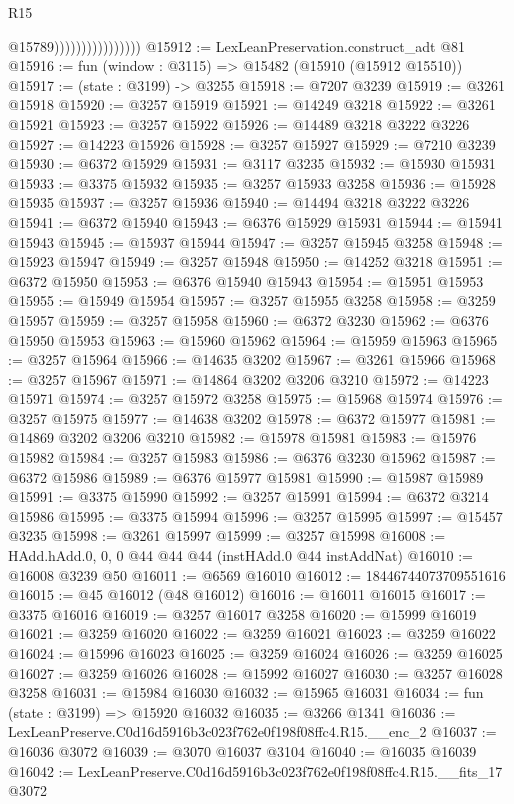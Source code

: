 \begin{lexlean}{R15}
\begin{coremodule}
                                    @15789))))))))))))))))
@15912 := LexLeanPreservation.construct_adt @81
@15916 := fun (window : @3115) => @15482 (@15910 (@15912 @15510))
@15917 := (state : @3199) -> @3255
@15918 := @7207 @3239
@15919 := @3261 @15918
@15920 := @3257 @15919
@15921 := @14249 @3218
@15922 := @3261 @15921
@15923 := @3257 @15922
@15926 := @14489 @3218 @3222 @3226
@15927 := @14223 @15926
@15928 := @3257 @15927
@15929 := @7210 @3239
@15930 := @6372 @15929
@15931 := @3117 @3235
@15932 := @15930 @15931
@15933 := @3375 @15932
@15935 := @3257 @15933 @3258
@15936 := @15928 @15935
@15937 := @3257 @15936
@15940 := @14494 @3218 @3222 @3226
@15941 := @6372 @15940
@15943 := @6376 @15929 @15931
@15944 := @15941 @15943
@15945 := @15937 @15944
@15947 := @3257 @15945 @3258
@15948 := @15923 @15947
@15949 := @3257 @15948
@15950 := @14252 @3218
@15951 := @6372 @15950
@15953 := @6376 @15940 @15943
@15954 := @15951 @15953
@15955 := @15949 @15954
@15957 := @3257 @15955 @3258
@15958 := @3259 @15957
@15959 := @3257 @15958
@15960 := @6372 @3230
@15962 := @6376 @15950 @15953
@15963 := @15960 @15962
@15964 := @15959 @15963
@15965 := @3257 @15964
@15966 := @14635 @3202
@15967 := @3261 @15966
@15968 := @3257 @15967
@15971 := @14864 @3202 @3206 @3210
@15972 := @14223 @15971
@15974 := @3257 @15972 @3258
@15975 := @15968 @15974
@15976 := @3257 @15975
@15977 := @14638 @3202
@15978 := @6372 @15977
@15981 := @14869 @3202 @3206 @3210
@15982 := @15978 @15981
@15983 := @15976 @15982
@15984 := @3257 @15983
@15986 := @6376 @3230 @15962
@15987 := @6372 @15986
@15989 := @6376 @15977 @15981
@15990 := @15987 @15989
@15991 := @3375 @15990
@15992 := @3257 @15991
@15994 := @6372 @3214 @15986
@15995 := @3375 @15994
@15996 := @3257 @15995
@15997 := @15457 @3235
@15998 := @3261 @15997
@15999 := @3257 @15998
@16008 := HAdd.hAdd.{0, 0, 0} @44 @44 @44 (instHAdd.{0} @44 instAddNat)
@16010 := @16008 @3239 @50
@16011 := @6569 @16010
@16012 := 18446744073709551616
@16015 := @45 @16012 (@48 @16012)
@16016 := @16011 @16015
@16017 := @3375 @16016
@16019 := @3257 @16017 @3258
@16020 := @15999 @16019
@16021 := @3259 @16020
@16022 := @3259 @16021
@16023 := @3259 @16022
@16024 := @15996 @16023
@16025 := @3259 @16024
@16026 := @3259 @16025
@16027 := @3259 @16026
@16028 := @15992 @16027
@16030 := @3257 @16028 @3258
@16031 := @15984 @16030
@16032 := @15965 @16031
@16034 := fun (state : @3199) => @15920 @16032
@16035 := @3266 @1341
@16036 := LexLeanPreserve.C0d16d5916b3c023f762e0f198f08ffc4.R15.__enc_2
@16037 := @16036 @3072
@16039 := @3070 @16037 @3104
@16040 := @16035 @16039
@16042 := LexLeanPreserve.C0d16d5916b3c023f762e0f198f08ffc4.R15.__fits_17 @3072

\end{coremodule}
\end{lexlean}
